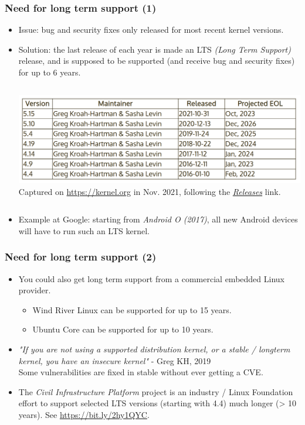\begin{frame}[fragile]
  \frametitle{Need for long term support (1)}
  \begin{itemize}
  \item Issue: bug and security fixes only released for most recent
    kernel versions.
  \item Solution: the last release of each year is made an LTS {\em (Long Term
     Support)} release, and is supposed to be supported (and receive bug
    and security fixes) for up to 6 years.
  \begin{columns}
  \includegraphics[width=\textwidth]{slides/sysdev-linux-intro-versioning/long-term-support-kernels.png}\\
  \scriptsize
   Captured on \url{https://kernel.org} in Nov. 2021, following the
   \href{https://www.kernel.org/category/releases.html}{\em Releases} link.
  \end{columns}
  \item Example at Google: starting from {\em Android O (2017)}, all new Android devices will
    have to run such an LTS kernel.
  \end{itemize}
\end{frame}

\begin{frame}[fragile]
  \frametitle{Need for long term support (2)}
  \begin{itemize}
  \item You could also get long term support from a commercial embedded
    Linux provider.
    \begin{itemize}
	\item Wind River Linux can be supported for up to 15 years.
	\item Ubuntu Core can be supported for up to 10 years.
    \end{itemize}
  \item {\em "If you are not using a supported distribution kernel, or a stable / longterm
    kernel, you have an insecure kernel"} - Greg KH, 2019\\
    Some vulnerabilities are fixed in stable without ever getting a CVE.
  \item The {\em Civil Infrastructure Platform} project is an industry /
    Linux Foundation effort to support selected LTS versions (starting
    with 4.4) much longer (> 10 years). See \url{https://bit.ly/2hy1QYC}.
  \end{itemize}
\end{frame}

